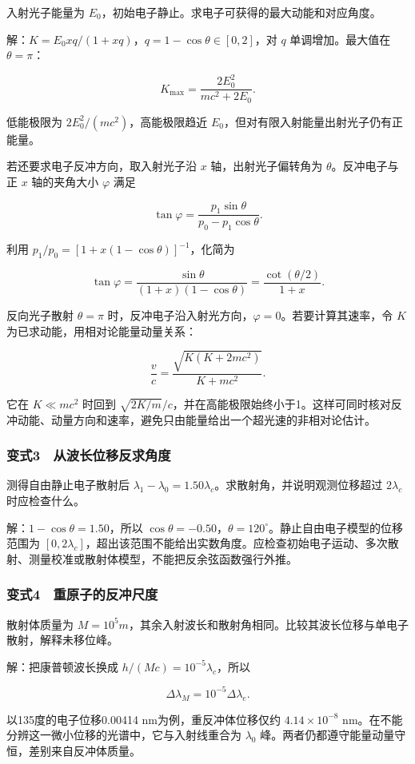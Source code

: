 \documentclass[12pt,a4paper,fontset=fandol]{ctexart}
\begin{document}
入射光子能量为 \(E_0\)，初始电子静止。求电子可获得的最大动能和对应角度。

解：\(K=E_0xq/(1+xq)\)，\(q=1-\cos\theta\in[0,2]\)，对 \(q\)
单调增加。最大值在 \(\theta=\pi\)：

\[\boxed{K_{\max}=\frac{2E_0^2}{mc^2+2E_0}.}\]

低能极限为 \(2E_0^2/(mc^2)\)，高能极限趋近
\(E_0\)，但对有限入射能量出射光子仍有正能量。

若还要求电子反冲方向，取入射光子沿 \(x\) 轴，出射光子偏转角为
\(\theta\)。反冲电子与正 \(x\) 轴的夹角大小 \(\varphi\) 满足

\[\tan\varphi=\frac{p_1\sin\theta}{p_0-p_1\cos\theta}.\]

利用 \(p_1/p_0=[1+x(1-\cos\theta)]^{-1}\)，化简为

\[\tan\varphi=
\frac{\sin\theta}{(1+x)(1-\cos\theta)}
=\frac{\cot(\theta/2)}{1+x}.\]

反向光子散射 \(\theta=\pi\)
时，反冲电子沿入射光方向，\(\varphi=0\)。若要计算其速率，令 \(K\)
为已求动能，用相对论能量动量关系：

\[\frac vc=\frac{\sqrt{K(K+2mc^2)}}{K+mc^2}.\]

它在 \(K\ll mc^2\) 时回到
\(\sqrt{2K/m}/c\)，并在高能极限始终小于1。这样可同时核对反冲动能、动量方向和速率，避免只由能量给出一个超光速的非相对论估计。

\noindent\begin{minipage}{\linewidth}
\subsubsection{变式3　从波长位移反求角度}\label{ux53d8ux5f0f3-ux4eceux6ce2ux957fux4f4dux79fbux53cdux6c42ux89d2ux5ea6}

测得自由静止电子散射后
\(\lambda_1-\lambda_0=1.50\lambda_c\)。求散射角，并说明观测位移超过
\(2\lambda_c\) 时应检查什么。

解：\(1-\cos\theta=1.50\)，所以
\(\cos\theta=-0.50\)，\(\theta=120^\circ\)。静止自由电子模型的位移范围为
\([0,2\lambda_c]\)，超出该范围不能给出实数角度。应检查初始电子运动、多次散射、测量校准或散射体模型，不能把反余弦函数强行外推。

\subsubsection{变式4　重原子的反冲尺度}\label{ux53d8ux5f0f4-ux91cdux539fux5b50ux7684ux53cdux51b2ux5c3aux5ea6}

散射体质量为
\(M=10^5m\)，其余入射波长和散射角相同。比较其波长位移与单电子散射，解释未移位峰。

解：把康普顿波长换成 \(h/(Mc)=10^{-5}\lambda_c\)，所以

\[\Delta\lambda_M=10^{-5}\Delta\lambda_e.\]

以135度的电子位移0.00414 nm为例，重反冲体位移仅约 \(4.14\times10^{-8}\)
nm。在不能分辨这一微小位移的光谱中，它与入射线重合为 \(\lambda_0\)
峰。两者仍都遵守能量动量守恒，差别来自反冲体质量。

\end{minipage}
\end{document}
